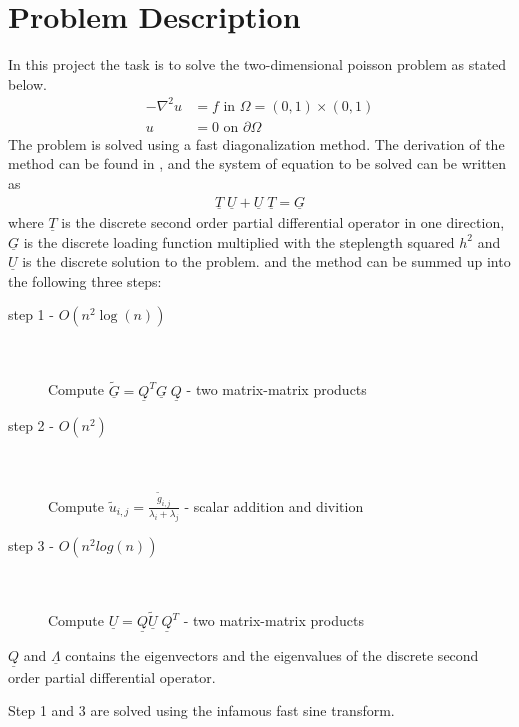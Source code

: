 \section{Problem Description}

In this project the task is to solve the two-dimensional poisson problem as stated below.
\begin{align}
	-\nabla^2 u &= f  \text{ in } \Omega = (0,1)\times(0,1) \\
	u &=  0 \text{ on } \partial \Omega
\end{align}
%
The problem is solved using a fast diagonalization method. The derivation of the method can be found in \cite{poisson} ,
and the system of equation to be solved can be written as 
\begin{align}
	\underline{T} \; \underline{U} + 	\underline{U} \; \underline{T} = \underline{G} 	
	\label{eq:Matrix}
\end{align}
where $\underline{T}$ is the discrete second order partial differential operator in one direction, 
$\underline{G}$ is the discrete loading function multiplied with the steplength squared $h^2$ and $\underline{U}$ is the discrete solution
to the problem.
and the method can be summed up into the following three steps:


\begin{description}
	\item[step 1  -  $O(n^2\log(n))$] \hfill \\ \hfill \\
		Compute $\underline{\tilde{G}} = \underline{Q}^T\underline{G} \; \underline{Q} $    -    two matrix-matrix products 
		\hfill \\
	\item[step 2  -  $O(n^2)$] \hfill \\ \hfill \\
		Compute $\tilde{u}_{i,j} = \frac{\tilde{g}_{i,j}}{\lambda_i+\lambda_j}$    -    scalar addition and divition
		\hfill \\
	\item[step 3  -  $O(n^2log(n))$] \hfill \\ \hfill \\
		Compute $\underline{U} = \underline{Q}\underline{\tilde{U}} \; \underline{Q}^T $    -     two matrix-matrix products 
\end{description}

$\underline{Q}$ and $\underline{\Lambda}$ contains the eigenvectors and the eigenvalues of the discrete 
second order partial differential operator. 

Step 1 and 3 are solved using the infamous fast sine transform.
